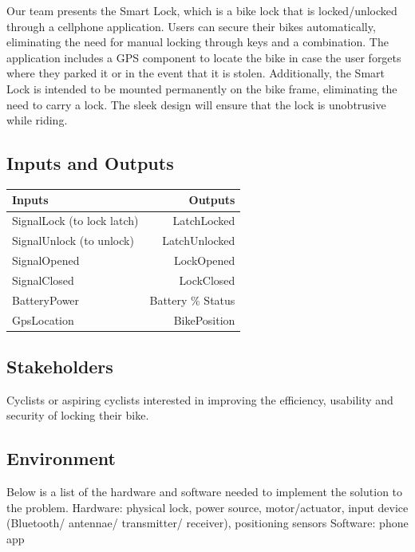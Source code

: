 \documentclass{article}
\begin{document}
Our team presents the Smart Lock, which is a bike lock that is locked/unlocked through a cellphone application.  Users can secure their bikes automatically, eliminating the need for manual locking through keys and a combination.  The application includes a GPS component to locate the bike in case the user forgets where they parked it or in the event that it is stolen.  Additionally, the Smart Lock is intended to be mounted permanently on the bike frame, eliminating the need to carry a lock.  The sleek design will ensure that the lock is unobtrusive while riding. 


\subsection{Inputs and Outputs}

\begin{table}[hp]
  \begin{center}
    \begin{tabular}{| l | r |}
    \hline
      \textbf{Inputs} & \textbf{Outputs}\\
      \hline
      SignalLock (to lock latch)  & LatchLocked\\
	    SignalUnlock (to unlock) & LatchUnlocked\\
	    SignalOpened & LockOpened\\
	    SignalClosed & LockClosed\\
	    BatteryPower & Battery \% Status\\
	    GpsLocation & BikePosition\\
	    \hline
    \end{tabular}
  \end{center}
\end{table}

\subsection{Stakeholders}

Cyclists or aspiring cyclists interested in improving the efficiency, usability and security of locking their bike.

\subsection{Environment}

Below is a list of the  hardware and software needed to implement the solution to the problem.
Hardware: physical lock, power source, motor/actuator, input device (Bluetooth/ antennae/ transmitter/ receiver), positioning sensors 
Software: phone app
\end{document}
